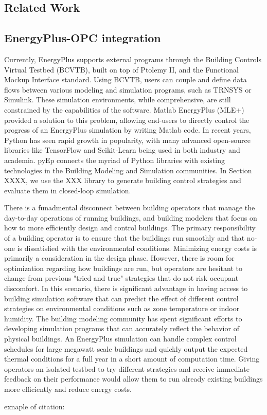 \subsection{Related Work}

\subsection{EnergyPlus-OPC integration}
Currently, EnergyPlus supports external programs through the Building Controls Virtual Testbed (BCVTB), built on top of Ptolemy II, and the Functional Mockup Interface standard. Using BCVTB, users can couple and define data flows between various modeling and simulation programs, such as TRNSYS or Simulink. These simulation environments, while comprehensive, are still constrained by the capabilities of the software. Matlab EnergyPlus (MLE+) provided a solution to this problem, allowing end-users to directly control the progress of an EnergyPlus simulation by writing Matlab code. In recent years, Python has seen rapid growth in popularity, with many advanced open-source libraries like TensorFlow and Scikit-Learn being used in both industry and academia. pyEp connects the myriad of Python libraries with existing technologies in the Building Modeling and Simulation communities. In Section XXXX, we use the XXX library to generate building control strategies and evaluate them in closed-loop simulation.

There is a funadmental disconnect between building operators that manage the day-to-day operations of running buildings, and building modelers that focus on how to more efficiently design and control buildings. The primary responsibility of a building operator is to ensure that the buildings run smoothly and that no-one is dissatisfied with the environmental conditions. Minimizing energy costs is primarily a consideration in the design phase. However, there is room for optimization regarding how buildings are run, but operators are hesitant to change from previous "tried and true" strategies that do not risk occupant discomfort. In this scenario, there is significant advantage in having access to building simulation software that can predict the effect of different control strategies on environmental conditions such as zone temperature or indoor humidity.
The building modeling community has spent significant efforts to developing simulation programs that can accurately reflect the behavior of physical buildings. An EnergyPlus simulation can handle complex control schedules for large megawatt scale buildings and quickly output the expected thermal conditions for a full year in a short amount of computation time. Giving operators an isolated testbed to try different strategies and receive immediate feedback on their performance would allow them to run already existing buildings more efficiently and reduce energy costs.
 





exnaple of citation: \cite{Camacho2013}